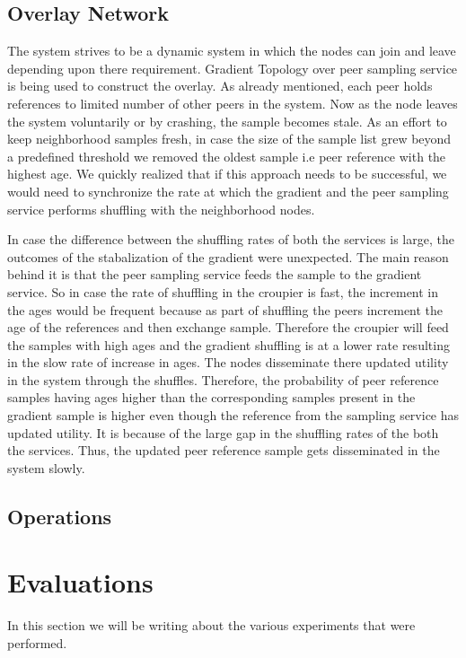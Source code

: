 \documentclass[a4paper, 11pt]{article}
\begin{document}
\subsection{Overlay Network}
The system strives to be a dynamic system in which the nodes can join and leave depending upon there requirement. Gradient Topology over peer sampling service is being used to construct the overlay. As already mentioned, each peer holds references to limited number of other peers in the system. Now as the node leaves the system voluntarily or by crashing, the sample becomes stale. As an effort to keep neighborhood samples fresh, in case the size of the sample list grew beyond a predefined threshold we removed the oldest sample i.e peer reference with the highest age. We quickly realized that if this approach needs to be successful, we would need to synchronize the rate at which the gradient and the peer sampling service performs shuffling with the neighborhood nodes.
\par In case the difference between the shuffling rates of both the services is large, the outcomes of the stabalization of the gradient were unexpected. The main reason behind it is that the peer sampling service feeds the sample to the gradient service. So in case the rate of shuffling in the croupier is fast, the increment in the ages would be frequent because as part of shuffling the peers increment the age of the references and then exchange sample. Therefore the croupier will feed the samples with high ages and the gradient shuffling is at a lower rate resulting in the slow rate of increase in ages. The nodes disseminate there updated utility in the system through the shuffles. Therefore, the probability of peer reference samples having ages higher than the corresponding samples present in the gradient sample is higher even though the reference from the sampling service has updated utility. It is because of the large gap in the shuffling rates of the both the services. Thus, the updated peer reference sample gets disseminated in the system slowly.

\subsection{Operations}


\newpage
\section{Evaluations}


In this section we will be writing about the various experiments that were performed.
\end{document}
